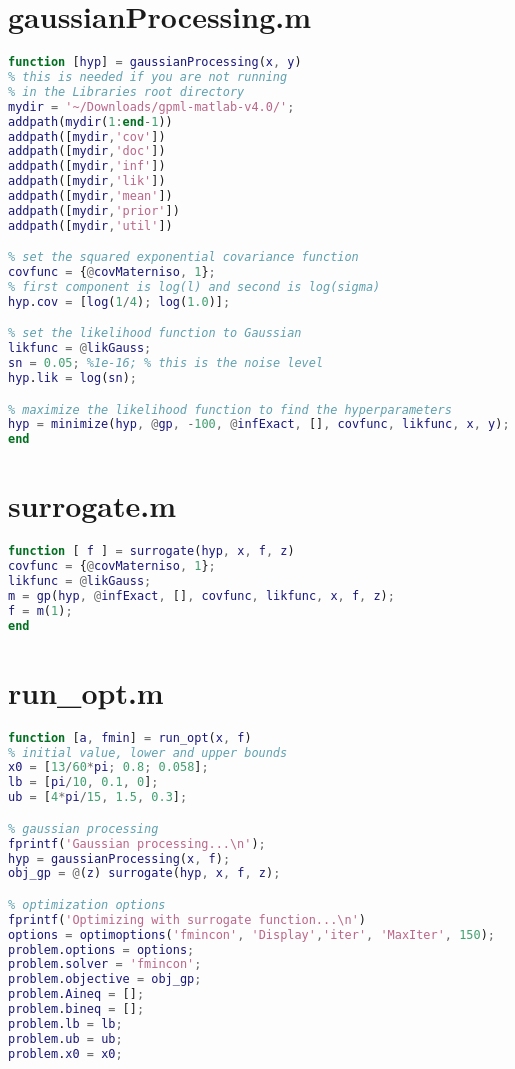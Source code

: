 \documentclass[a4paper]{article}
\begin{document}
\begin{appendices}
\section{gaussianProcessing.m}\label{app:gp}
\begin{lstlisting}[language=Matlab]
function [hyp] = gaussianProcessing(x, y)
% this is needed if you are not running 
% in the Libraries root directory
mydir = '~/Downloads/gpml-matlab-v4.0/';
addpath(mydir(1:end-1))
addpath([mydir,'cov'])
addpath([mydir,'doc'])
addpath([mydir,'inf'])
addpath([mydir,'lik'])
addpath([mydir,'mean'])
addpath([mydir,'prior'])
addpath([mydir,'util'])

% set the squared exponential covariance function
covfunc = {@covMaterniso, 1};
% first component is log(l) and second is log(sigma)
hyp.cov = [log(1/4); log(1.0)]; 

% set the likelihood function to Gaussian
likfunc = @likGauss;
sn = 0.05; %1e-16; % this is the noise level
hyp.lik = log(sn);

% maximize the likelihood function to find the hyperparameters
hyp = minimize(hyp, @gp, -100, @infExact, [], covfunc, likfunc, x, y);
end
\end{lstlisting}

\section{surrogate.m}\label{app:nonlcon}
\begin{lstlisting}[language=Matlab]
function [ f ] = surrogate(hyp, x, f, z)
covfunc = {@covMaterniso, 1};
likfunc = @likGauss;
m = gp(hyp, @infExact, [], covfunc, likfunc, x, f, z);
f = m(1);
end
\end{lstlisting}

\section{run\_opt.m}
\begin{lstlisting}[language=Matlab]
function [a, fmin] = run_opt(x, f)
% initial value, lower and upper bounds
x0 = [13/60*pi; 0.8; 0.058];
lb = [pi/10, 0.1, 0];
ub = [4*pi/15, 1.5, 0.3];

% gaussian processing
fprintf('Gaussian processing...\n');
hyp = gaussianProcessing(x, f);
obj_gp = @(z) surrogate(hyp, x, f, z);

% optimization options
fprintf('Optimizing with surrogate function...\n')
options = optimoptions('fmincon', 'Display','iter', 'MaxIter', 150);
problem.options = options;
problem.solver = 'fmincon';
problem.objective = obj_gp;
problem.Aineq = [];
problem.bineq = [];
problem.lb = lb;
problem.ub = ub;
problem.x0 = x0;


\end{lstlisting}
\end{appendices}
\end{document}
